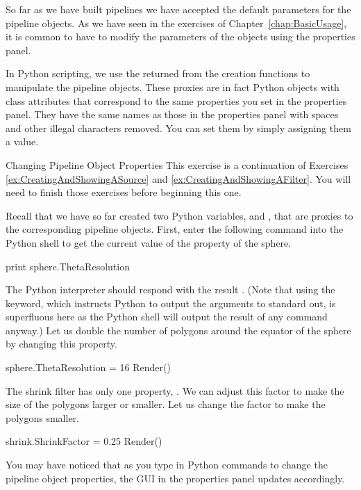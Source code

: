 So far as we have built pipelines we have accepted the default parameters
for the pipeline objects.  As we have seen in the exercises of
Chapter~\ref{chap:BasicUsage}, it is common to have to modify the
parameters of the objects using the properties panel.

In Python scripting, we use the 
returned from the creation functions to manipulate the pipeline objects.
These proxies are in fact Python objects with class attributes that
correspond to the same properties you set in the properties panel.  They
have the same names as those in the properties panel with spaces and other
illegal characters removed.  You can set them by simply assigning them a
value.

\begin{exercise}{Changing Pipeline Object Properties}
  \label{ex:ChangingPipelineObjectProperties}%
  This exercise is a continuation of Exercises
  \ref{ex:CreatingAndShowingASource} and
  \ref{ex:CreatingAndShowingAFilter}.  You will need to finish those
  exercises before beginning this one.

  Recall that we have so far created two Python variables, 
  and , that are proxies to the corresponding pipeline
  objects.  First, enter the following command into the Python shell to get
  the current value of the  property of the sphere.

  \begin{python}
print sphere.ThetaResolution
  \end{python}

  The Python interpreter should respond with the result .  (Note
  that using the  keyword, which instructs Python to output
  the arguments to standard out, is superfluous here as the Python shell
  will output the result of any command anyway.)  Let us double the number
  of polygons around the equator of the sphere by changing this property.

  \begin{python}
sphere.ThetaResolution = 16
Render()
  \end{python}

  The shrink filter has only one property, .  We can
  adjust this factor to make the size of the polygons larger or smaller.
  Let us change the factor to make the polygons smaller.

  \begin{python}
shrink.ShrinkFactor = 0.25
Render()
  \end{python}

  You may have noticed that as you type in Python commands to change the
  pipeline object properties, the GUI in the properties panel updates
  accordingly.
\end{exercise}

